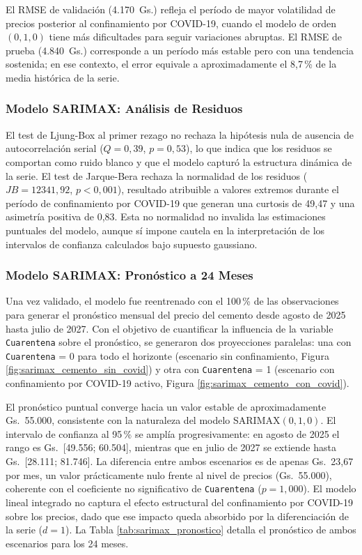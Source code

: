 \justify
El RMSE de validación (4.170~Gs.) refleja el período de mayor volatilidad de precios posterior al confinamiento por COVID-19, cuando el modelo de orden $(0,1,0)$ tiene más dificultades para seguir variaciones abruptas. El RMSE de prueba (4.840~Gs.) corresponde a un período más estable pero con una tendencia sostenida; en ese contexto, el error equivale a aproximadamente el 8,7\,\% de la media histórica de la serie.

\subsubsection{Modelo SARIMAX: Análisis de Residuos}

\justify
El test de Ljung-Box al primer rezago no rechaza la hipótesis nula de ausencia de autocorrelación serial ($Q = 0{,}39$, $p = 0{,}53$), lo que indica que los residuos se comportan como ruido blanco y que el modelo capturó la estructura dinámica de la serie. El test de Jarque-Bera rechaza la normalidad de los residuos ($JB = 12341{,}92$, $p < 0{,}001$), resultado atribuible a valores extremos durante el período de confinamiento por COVID-19 que generan una curtosis de 49{,}47 y una asimetría positiva de 0{,}83. Esta no normalidad no invalida las estimaciones puntuales del modelo, aunque sí impone cautela en la interpretación de los intervalos de confianza calculados bajo supuesto gaussiano.

\subsubsection{Modelo SARIMAX: Pronóstico a 24 Meses}

\justify
Una vez validado, el modelo fue reentrenado con el 100\,\% de las observaciones para generar el pronóstico mensual del precio del cemento desde agosto de 2025 hasta julio de 2027. Con el objetivo de cuantificar la influencia de la variable \texttt{Cuarentena} sobre el pronóstico, se generaron dos proyecciones paralelas: una con \texttt{Cuarentena} = 0 para todo el horizonte (escenario sin confinamiento, Figura \ref{fig:sarimax_cemento_sin_covid}) y otra con \texttt{Cuarentena} = 1 (escenario con confinamiento por COVID-19 activo, Figura \ref{fig:sarimax_cemento_con_covid}).

\justify
El pronóstico puntual converge hacia un valor estable de aproximadamente Gs.~55.000, consistente con la naturaleza del modelo SARIMAX$(0,1,0)$. El intervalo de confianza al 95\,\% se amplía progresivamente: en agosto de 2025 el rango es Gs.~[49.556; 60.504], mientras que en julio de 2027 se extiende hasta Gs.~[28.111; 81.746]. La diferencia entre ambos escenarios es de apenas Gs.~23{,}67 por mes, un valor prácticamente nulo frente al nivel de precios (Gs.~55.000), coherente con el coeficiente no significativo de \texttt{Cuarentena} ($p = 1{,}000$). El modelo lineal integrado no captura el efecto estructural del confinamiento por COVID-19 sobre los precios, dado que ese impacto queda absorbido por la diferenciación de la serie ($d = 1$). La Tabla \ref{tab:sarimax_pronostico} detalla el pronóstico de ambos escenarios para los 24 meses.

